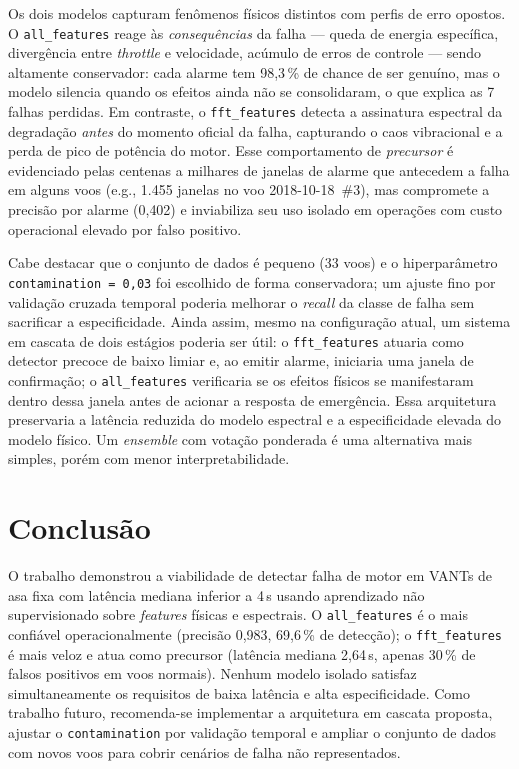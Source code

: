 \documentclass[12pt, a4paper]{article}
\begin{document}
Os dois modelos capturam fenômenos físicos distintos com perfis de erro opostos. O \texttt{all\_features} reage às \textit{consequências} da falha --- queda de energia específica, divergência entre \textit{throttle} e velocidade, acúmulo de erros de controle --- sendo altamente conservador: cada alarme tem 98{,}3\,\% de chance de ser genuíno, mas o modelo silencia quando os efeitos ainda não se consolidaram, o que explica as 7 falhas perdidas. Em contraste, o \texttt{fft\_features} detecta a assinatura espectral da degradação \textit{antes} do momento oficial da falha, capturando o caos vibracional e a perda de pico de potência do motor. Esse comportamento de \textit{precursor} é evidenciado pelas centenas a milhares de janelas de alarme que antecedem a falha em alguns voos (e.g., 1.455 janelas no voo 2018-10-18~\#3), mas compromete a precisão por alarme (0{,}402) e inviabiliza seu uso isolado em operações com custo operacional elevado por falso positivo.

Cabe destacar que o conjunto de dados é pequeno (33 voos) e o hiperparâmetro \texttt{contamination\,=\,0{,}03} foi escolhido de forma conservadora; um ajuste fino por validação cruzada temporal poderia melhorar o \textit{recall} da classe de falha sem sacrificar a especificidade. Ainda assim, mesmo na configuração atual, um sistema em cascata de dois estágios poderia ser útil: o \texttt{fft\_features} atuaria como detector precoce de baixo limiar e, ao emitir alarme, iniciaria uma janela de confirmação; o \texttt{all\_features} verificaria se os efeitos físicos se manifestaram dentro dessa janela antes de acionar a resposta de emergência. Essa arquitetura preservaria a latência reduzida do modelo espectral e a especificidade elevada do modelo físico. Um \textit{ensemble} com votação ponderada é uma alternativa mais simples, porém com menor interpretabilidade.

\section{Conclusão}

O trabalho demonstrou a viabilidade de detectar falha de motor em VANTs de asa fixa com latência mediana inferior a 4\,s usando aprendizado não supervisionado sobre \textit{features} físicas e espectrais. O \texttt{all\_features} é o mais confiável operacionalmente (precisão 0{,}983, 69{,}6\,\% de detecção); o \texttt{fft\_features} é mais veloz e atua como precursor (latência mediana 2{,}64\,s, apenas 30\,\% de falsos positivos em voos normais). Nenhum modelo isolado satisfaz simultaneamente os requisitos de baixa latência e alta especificidade. Como trabalho futuro, recomenda-se implementar a arquitetura em cascata proposta, ajustar o \texttt{contamination} por validação temporal e ampliar o conjunto de dados com novos voos para cobrir cenários de falha não representados.
\end{document}
